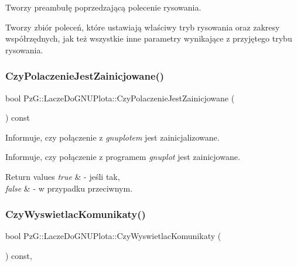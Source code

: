 Tworzy preambułę poprzedzającą polecenie rysowania. 

Tworzy zbiór poleceń, które ustawiają właściwy tryb rysowania oraz zakresy współrzędnych, jak też wszystkie inne parametry wynikające z przyjętego trybu rysowania. \mbox{\label{classPzG_1_1LaczeDoGNUPlota_af8be8aeb3b1b524fab67d4411cba5b9e}} 
\subsubsection{\texorpdfstring{Czy\+Polaczenie\+Jest\+Zainicjowane()}{CzyPolaczenieJestZainicjowane()}}
{\footnotesize\ttfamily bool Pz\+G\+::\+Lacze\+Do\+G\+N\+U\+Plota\+::\+Czy\+Polaczenie\+Jest\+Zainicjowane (\begin{DoxyParamCaption}{ }\end{DoxyParamCaption}) const}



Informuje, czy połączenie z {\itshape gnuplot\textquotesingle{}em} jest zainicjalizowane. 

Informuje, czy połączenie z programem {\itshape gnuplot} jest zainicjowane. 
\begin{DoxyRetVals}{Return values}
{\em true} & -\/ jeśli tak, \\
\hline
{\em false} & -\/ w przypadku przeciwnym. \\
\hline
\end{DoxyRetVals}
\mbox{\label{classPzG_1_1LaczeDoGNUPlota_a5e4f3a226ed36f7110032d802d84847c}} 
\subsubsection{\texorpdfstring{Czy\+Wyswietlac\+Komunikaty()}{CzyWyswietlacKomunikaty()}}
{\footnotesize\ttfamily bool Pz\+G\+::\+Lacze\+Do\+G\+N\+U\+Plota\+::\+Czy\+Wyswietlac\+Komunikaty (\begin{DoxyParamCaption}{ }\end{DoxyParamCaption}) const\hspace{0.3cm}{\ttfamily [inline]}, {\ttfamily [protected]}}



